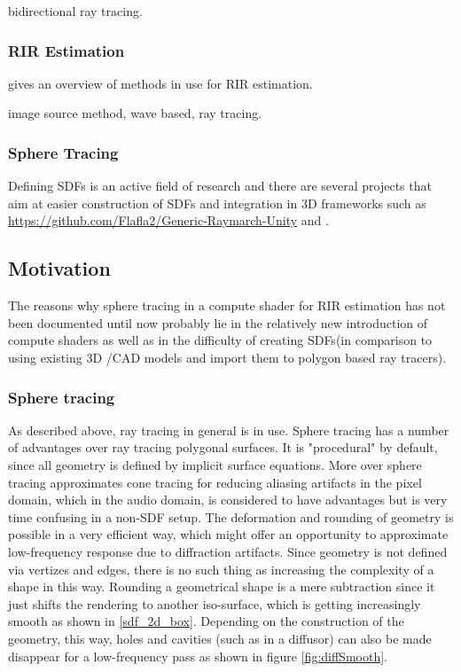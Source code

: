 \documentclass[twoside,a4paper]{article}
\begin{document}
\cite{cao_interactive_2016} bidirectional ray tracing.

\subsubsection*{RIR Estimation}
\cite{alpkocak_computing_2010} gives an overview of methods in use for RIR estimation.

image source method, wave based, ray tracing.


\subsubsection*{Sphere Tracing}

Defining SDFs is an active field of research and there are several projects that aim at easier construction of SDFs and integration in 3D frameworks such as \href{https://github.com/Flafla2/Generic-Raymarch-Unity}{https://github.com/Flafla2/Generic-Raymarch-Unity} and \cite{lechner_hrtlacektdraymarchtoolkit_2020}.



\subsection{Motivation}
The reasons why sphere tracing in a compute shader for RIR estimation has not been documented until now probably lie in the relatively new introduction of compute shaders as well as in the difficulty of creating SDFs(in comparison to using existing 3D /CAD models and import them to polygon based ray tracers).
\subsubsection{Sphere tracing}
As described above, ray tracing in general is in use. Sphere tracing has a number of advantages over ray tracing polygonal surfaces. It is "procedural" by default, since all geometry is defined by implicit surface equations. More over sphere tracing approximates cone tracing for reducing aliasing artifacts in the pixel domain\cite{hart_sphere_1996}, which in the audio domain, is considered to have advantages but is very time confusing in a non-SDF setup\cite{alpkocak_computing_2010}. The deformation and rounding of geometry is possible in a very efficient way, which might offer an opportunity to approximate low-frequency response due to diffraction artifacts. Since geometry is not defined via vertizes and edges, there is no such thing as increasing the complexity of a shape in this way. Rounding a geometrical shape is a mere subtraction since it just shifts the rendering to another iso-surface, which is getting increasingly smooth as shown in \ref{sdf_2d_box}. Depending on the construction of the geometry, this way, holes and cavities (such as in a diffusor) can also be made disappear for a low-frequency pass as shown in figure \ref{fig:diffSmooth}.
\end{document}
